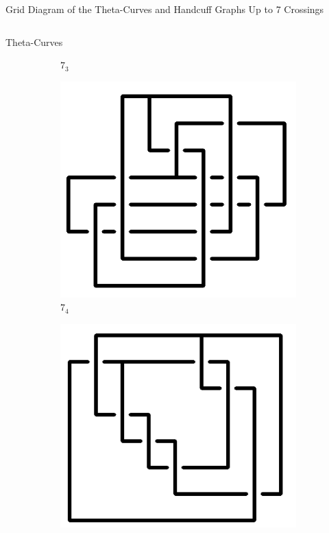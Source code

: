 \documentclass[final]{beamer}
\begin{document}
\begin{frame}[t]
\begin{alertblock}{Grid Diagram of the Theta-Curves and Handcuff Graphs Up to 7 Crossings}
\begin{columns}[t]
\begin{column}{0.5\textwidth}
\begin{alertblock}{Theta-Curves}
\begin{figure}
\begin{subfigure}{0.075\textwidth}
    \caption{$7_{3}$} 
    \end{subfigure}
    \begin{subfigure}{0.075\textwidth}
    \includegraphics[width=\columnwidth]{../Midterm_Poster/grid_diagram/theta_7_4.png}
    \caption{$7_{4}$} 
    \end{subfigure}
    \begin{subfigure}{0.075\textwidth}
    \includegraphics[width=\columnwidth]{../Midterm_Poster/grid_diagram/theta_7_5.png}

\end{subfigure}
\end{figure}
\end{alertblock}
\end{column}
\end{columns}
\end{alertblock}
\end{frame}
\end{document}
